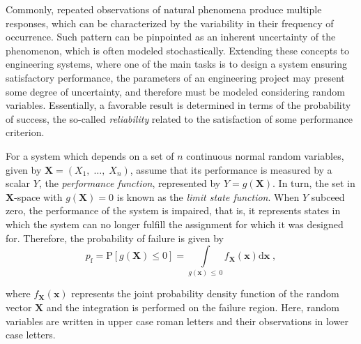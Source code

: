 \documentclass[final,5p,times,twocolumn,numbers]{elsarticle}
\begin{document}
Commonly, repeated observations of natural phenomena produce multiple responses, which can be characterized by the variability in their frequency of occurrence. Such pattern can be pinpointed as an inherent uncertainty of the phenomenon, which is often modeled stochastically. Extending these concepts to engineering systems, where one of the main tasks is to design a system ensuring satisfactory performance, the parameters of an engineering project may present some degree of uncertainty, and therefore must be modeled considering random variables. Essentially, a favorable result is determined in terms of the probability of success, the so-called \textit{reliability} related to the satisfaction of some performance criterion.

For a system which depends on a set of $ n $ continuous normal random variables, given by $ \mathbf{X} = \left( X_{1}, \; \dots, \; X_{n} \right) $, assume that its performance is measured by a scalar $ Y $, the \textit{performance function}, represented by $ Y = g \left( \mathbf{X} \right) $. In turn, the set in $ \mathbf{X} $-space with $ g \left( \mathbf{X} \right) = 0 $ is known as the \textit{limit state function}. When $ Y $ subceed zero, the performance of the system is impaired, that is, it represents states in which the system can no longer fulfill the assignment for which it was designed for. Therefore, the probability of failure is given by
%
\begin{equation} \label{eq:integral_analise_confiabilidade}
p_{\mathrm{f}} = \mathrm{P} \left[ g \left( \mathbf{X} \right) \leq 0 \right] = \int\limits_{g \left( \mathbf{x} \right) \, \leq \, 0} f_{\mathbf{X}} \left( \mathbf{x} \right) \mathrm{d} \mathbf{x} \; ,
\end{equation}

\noindent where $ f_{\mathbf{X}} \left( \mathbf{x} \right) $ represents the joint probability density function of the random vector $ \mathbf{X} $ and the integration is performed on the failure region. Here, random variables are written in upper case roman letters and their observations in lower case letters.
\end{document}
